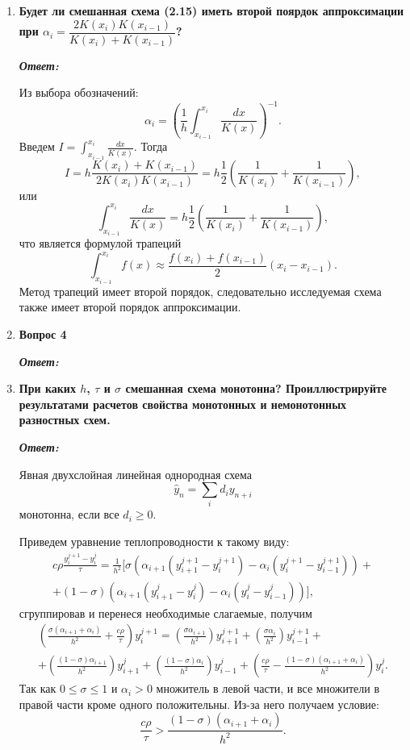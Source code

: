 \documentclass[12pt, a4paper]{article}
\begin{document}
\begin{enumerate}
		\item \textbf{Будет ли смешанная схема (2.15) иметь второй поярдок аппроксимации при $\alpha_i = \dfrac{2K(x_i)K(x_{i-1})}{K(x_i) + K(x_{i-1})}$?}
		\vspace*{0.2cm}
		
		\textit{\textbf{Ответ:}}
		
		Из выбора обозначений:
		\[
		\alpha_i = \left( \frac 1 h \int_{x_{i-1}}^{x_i} \frac{dx}{K(x)} \right)^{-1}.
		\]
		Введем $I = \int_{x_{i-1}}^{x_i} \frac{dx}{K(x)}$. Тогда
		\[
		I = h \dfrac{K(x_i) + K(x_{i-1})}{2K(x_i)K(x_{i-1})} = h \frac 1 2 \left( \frac{1}{K(x_i)} + \frac{1}{K(x_{i-1})} \right),
		\]
		или
		\[
		\int_{x_{i-1}}^{x_i} \frac{dx}{K(x)} = h \frac 1 2 \left( \frac{1}{K(x_i)} + \frac{1}{K(x_{i-1})} \right),
		\]
		что является формулой трапеций
		\[
		\int_{x_{i-1}}^{x_i} f(x) \approx \frac{f(x_i) + f(x_{i-1})}{2} \left( x_i - x_{i-1} \right).
		\]
		Метод трапеций имеет второй порядок, следовательно исследуемая схема также имеет второй порядок аппроксимации.
		\item \textbf{Вопрос 4}
		\vspace*{0.2cm}
		
		\textit{\textbf{Ответ:}}
				
		\item \textbf{При каких $h$, $\tau$ и $\sigma$ смешанная схема монотонна? Проиллюстрируйте результатами расчетов свойства монотонных и немонотонных разностных схем.}
		\vspace*{0.2cm}
		
		\textit{\textbf{Ответ:}}
		
		Явная двухслойная линейная однородная схема 
		\[
		\hat{y}_n =\sum_{i} d_i y_{n + i}
		\]
		монотонна, если все $d_i \geq 0$.

		Приведем уравнение теплопроводности к такому виду:
		\begin{multline*}
			c \rho \frac{y_i^{j+1}-y_i^j}\tau = \frac1{h^2}\Big[\sigma \left(\alpha_{i+1}(y_{i+1}^{j+1}-y_i^{j+1}) - \alpha_i(y_i^{j+1}-y_{i-1}^{j+1})\right) + \\
			+ (1-\sigma)\left(\alpha_{i+1}(y_{i+1}^j - y_i^j) - \alpha_i (y_i^j - y_{i-1}^j)\right)\Big],
		\end{multline*}
		сгруппировав и перенеся необходимые слагаемые, получим
		\begin{multline*}
			\left(\frac{\sigma (\alpha_{i+1}+\alpha_i)}{h^2} + \frac{c\rho}\tau\right)y_i^{j+1} = \left(\frac{\sigma \alpha_{i+1}}{h^2}\right)y_{i+1}^{j+1} + \left(\frac{\sigma \alpha_i}{h^2}\right)y_{i-1}^{j+1} + \\
			+ \left(\frac{(1-\sigma)\alpha_{i+1}}{h^2}\right) y_{i+1}^j + \left(\frac{(1-\sigma)\alpha_i}{h^2}\right) y_{i-1}^j + \left(\frac{c\rho}{\tau} - \frac{(1-\sigma)(\alpha_{i+1} + \alpha_i)}{h^2}\right) y_i^j.
		\end{multline*}
		Так как $0 \leq \sigma \leq 1$ и $\alpha_i > 0$ множитель в левой части, и все множители в правой части кроме одного положительны. Из-за него получаем условие:
		\[
		\frac{c\rho}{\tau} > \frac{\left( 1 - \sigma \right) \left( \alpha_{i+1} + \alpha_i \right)}{h^2}.
		\]
		

\end{enumerate}
\end{document}
